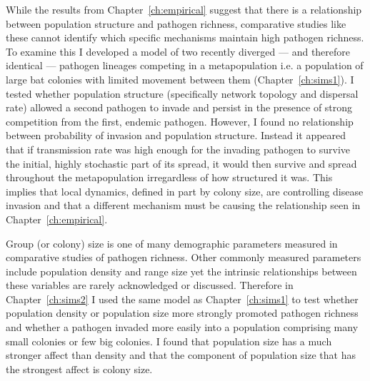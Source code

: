 While the results from Chapter~\ref{ch:empirical} suggest that there is a relationship between population structure and pathogen richness, comparative studies like these cannot identify which specific mechanisms maintain high pathogen richness.
To examine this I developed a model of two recently diverged --- and therefore identical --- pathogen lineages competing in a metapopulation i.e. a population of large bat colonies with limited movement between them (Chapter~\ref{ch:sims1}). 
I tested whether population structure (specifically network topology and dispersal rate) allowed a second pathogen to invade and persist in the presence of strong competition from the first, endemic pathogen.
However, I found no relationship between probability of invasion and population structure.
Instead it appeared that if transmission rate was high enough for the invading pathogen to survive the initial, highly stochastic part of its spread, it would then survive and spread throughout the metapopulation irregardless of how structured it was.
This implies that local dynamics, defined in part by colony size, are controlling disease invasion and that a different mechanism must be causing the relationship seen in Chapter~\ref{ch:empirical}.



Group (or colony) size is one of many demographic parameters measured in comparative studies of pathogen richness.
Other commonly measured parameters include population density and range size \cite{kamiya2014determines, nunn2003comparative, morand1998density, lindenfors2007parasite, gay2014parasite, ezenwa2006host} yet the intrinsic relationships between these variables are rarely acknowledged or discussed.
Therefore in Chapter~\ref{ch:sims2} I used the same model as Chapter~\ref{ch:sims1} to test whether population density or population size more strongly promoted pathogen richness and whether a pathogen invaded more easily into a population comprising many small colonies or few big colonies.
I found that population size has a much stronger affect than density and that the component of population size that has the strongest affect is colony size.


